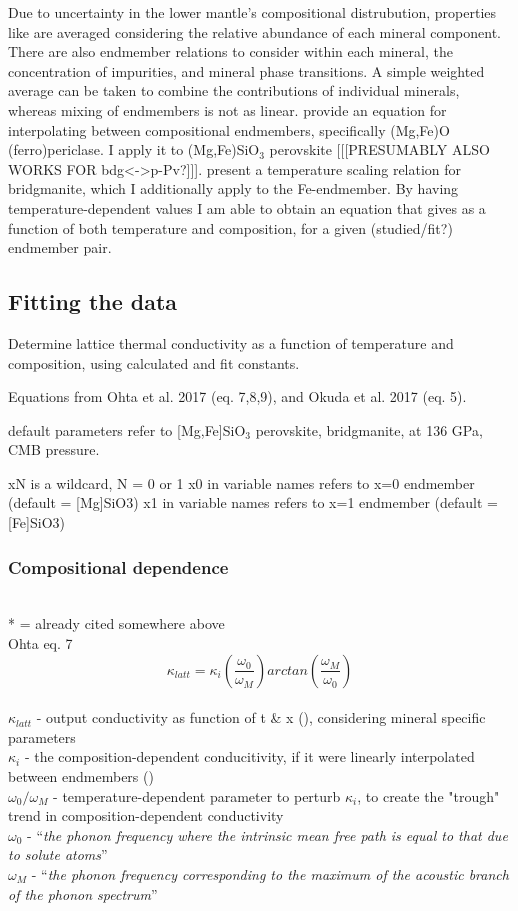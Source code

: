 Due to uncertainty in the lower mantle's compositional distrubution, properties like \tcs are averaged considering the relative abundance of each mineral component. There are also endmember relations to consider within each mineral, the concentration of impurities, and mineral phase transitions.  A simple weighted average can be taken to combine the contributions of individual minerals, whereas mixing of endmembers is not as linear. \cite{Ohta2017} provide an equation for interpolating \cs between compositional endmembers, specifically (Mg,Fe)O (ferro)periclase. I apply it to (Mg,Fe)SiO$_3$ perovskite [[[PRESUMABLY ALSO WORKS FOR bdg<->p-Pv?]]]. \cite{Okuda2017} present a temperature scaling relation for bridgmanite, which I additionally apply to the Fe-endmember. By having temperature-dependent values I am able to obtain an equation that gives \tcs as a function of both temperature and composition, for a given (studied/fit?) endmember pair.


\subsection{Fitting the data}

Determine lattice thermal conductivity as a function of temperature and composition, 
using calculated and fit constants.
    
Equations from Ohta et al. 2017 (eq. 7,8,9), and Okuda et al. 2017 (eq. 5).

default parameters refer to [Mg,Fe]SiO$_3$ perovskite, bridgmanite, at 136 GPa, CMB pressure.

xN is a wildcard, N = 0 or 1
x0 in variable names refers to x=0 endmember (default = [Mg]SiO3)
x1 in variable names refers to x=1 endmember (default = [Fe]SiO3)


\subsubsection{Compositional dependence}
\cite{Ohta2017}\\
* = already cited somewhere above\\

Ohta eq. 7 $$\kappa_{latt}=\kappa_{i}\left ( \frac{\omega_{0}}{\omega_{M}} \right )arctan\left ( \frac{\omega_{M}}{\omega_{0}} \right )$$
\\ $\kappa_{latt}$ - output conductivity as function of t \& x (\wmk), considering mineral specific parameters\\
$\kappa_{i}$ - the composition-dependent conducitivity, if it were linearly interpolated between endmembers (\wmk)\\
$\omega_{0}/\omega_{M}$ - temperature-dependent parameter to perturb $\kappa_{i}$, to create the "trough" trend in composition-dependent conductivity\\
$\omega_{0}$ - \enquote{\textit{the phonon frequency where the intrinsic mean free path is equal to that due to solute atoms}}\\
$\omega_{M}$ - \enquote{\textit{the phonon frequency corresponding to the maximum of the acoustic branch of the phonon spectrum}}\\

